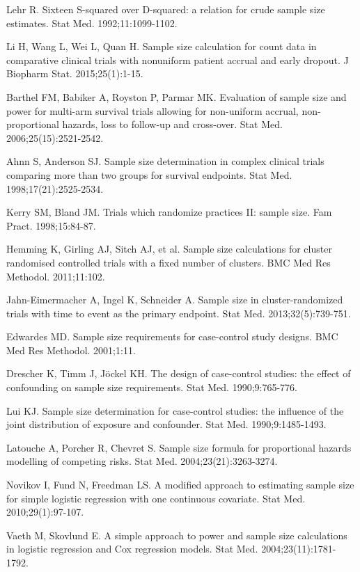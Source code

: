 \begin{references}
\item Lehr R. Sixteen S-squared over D-squared: a relation for crude sample size estimates. Stat Med. 1992;11:1099-1102.
\item Li H, Wang L, Wei L, Quan H. Sample size calculation for count data in comparative clinical trials with nonuniform patient accrual and early dropout. J Biopharm Stat. 2015;25(1):1-15.
\item Barthel FM, Babiker A, Royston P, Parmar MK. Evaluation of sample size and power for multi-arm survival trials allowing for non-uniform accrual, non- proportional hazards, loss to follow-up and cross-over. Stat Med. 2006;25(15):2521-2542.
\item Ahnn S, Anderson SJ. Sample size determination in complex clinical trials comparing more than two groups for survival endpoints. Stat Med. 1998;17(21):2525-2534.
\item Kerry SM, Bland JM. Trials which randomize practices II: sample size. Fam Pract. 1998;15:84-87.
\item Hemming K, Girling AJ, Sitch AJ, et al. Sample size calculations for cluster randomised controlled trials with a fixed number of clusters. BMC Med Res Methodol. 2011;11:102.
\item Jahn-Eimermacher A, Ingel K, Schneider A. Sample size in cluster-randomized trials with time to event as the primary endpoint. Stat Med. 2013;32(5):739-751.
\item Edwardes MD. Sample size requirements for case-control study designs. BMC Med Res Methodol. 2001;1:11.
\item Drescher K, Timm J, Jöckel KH. The design of case-control studies: the effect of confounding on sample size requirements. Stat Med. 1990;9:765-776.
\item Lui KJ. Sample size determination for case-control studies: the influence of the joint distribution of exposure and confounder. Stat Med. 1990;9:1485-1493.
\item Latouche A, Porcher R, Chevret S. Sample size formula for proportional hazards modelling of competing risks. Stat Med. 2004;23(21):3263-3274.
\item Novikov I, Fund N, Freedman LS. A modified approach to estimating sample size for simple logistic regression with one continuous covariate. Stat Med. 2010;29(1):97-107.
\item Vaeth M, Skovlund E. A simple approach to power and sample size calculations in logistic regression and Cox regression models. Stat Med. 2004;23(11):1781-1792.

\end{references}
